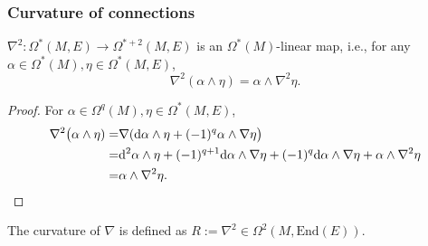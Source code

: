 \subsubsection*{Curvature of connections}
\begin{proposition}
    $\nabla^2: \Omega^*(M,E)\to\Omega^{*+2}(M,E)$ is an $\Omega^*(M)$-linear map, i.e., 
    for any $\alpha\in \Omega^*(M),\eta\in \Omega^*(M,E)$,
    \begin{equation*}
        \nabla^2(\alpha\wedge\eta) = \alpha\wedge\nabla^2 \eta.
    \end{equation*}
\end{proposition}
\begin{proof}
    For $\alpha\in \Omega^q(M),\eta\in \Omega^*(M,E)$, 
    \begin{align*}
        \nabla^2\big(\alpha\wedge\eta) 
        =& \nabla({\rm d}\alpha\wedge\eta 
        + (-1)^{q}\alpha\wedge \nabla\eta\big) \\
        =& {\rm d}^2\alpha\wedge\eta + (-1)^{q+1}{\rm d}\alpha\wedge \nabla\eta 
        + (-1)^q {\rm d}\alpha\wedge \nabla\eta 
        + \alpha\wedge\nabla^2 \eta \\
        =& \alpha\wedge\nabla^2 \eta. \qedhere
    \end{align*}
\end{proof}
\begin{definition}
    The curvature of $\nabla$ is defined as $R:=\nabla^2\in\Omega^2(M,\mathrm{End}(E))$.
\end{definition}

